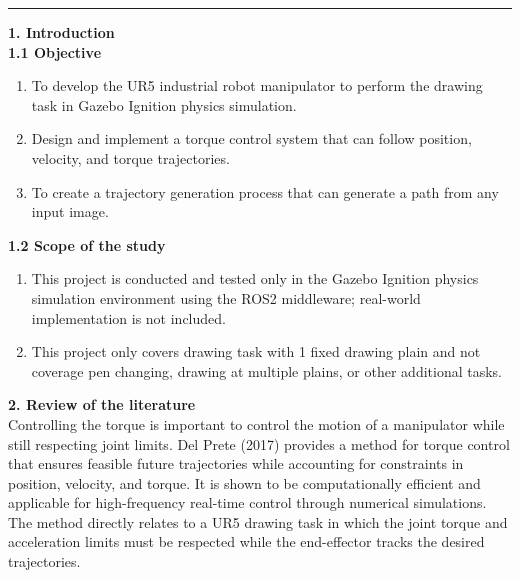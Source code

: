 \documentclass[10pt]{article}
\begin{document}
\vspace{0.4cm}
\noindent
\rule{\textwidth}{1pt}

\linespread{1.5} 
\vspace{0.2cm}
\noindent
\large
\textbf{1. Introduction} \\
\textbf{1.1 Objective}  \\
\normalsize
\begin{enumerate}[nosep, itemsep=-2pt] 
    \item To develop the UR5 industrial robot manipulator to perform the drawing task in Gazebo Ignition physics simulation. 
    \item Design and implement a torque control system that can follow position, velocity, and torque trajectories.
    \item To create a trajectory generation process that can generate a path from any input image.
\end{enumerate}
  
\vspace{8pt}
\noindent
\large 
\textbf{1.2 Scope of the study} \\ 
\normalsize
\begin{enumerate}[nosep, itemsep=-2pt] 
    \item This project is conducted and tested only in the Gazebo Ignition physics simulation environment using the ROS2 middleware; real-world implementation is not included.
    \item This project only covers drawing task with 1 fixed drawing plain and not coverage pen changing, drawing at multiple plains, or other additional tasks.
\end{enumerate}

\newpage

\large
\noindent
\textbf{2. Review of the literature} \\
\normalsize
\indent Controlling the torque is important to control the motion of a manipulator while still respecting joint limits. Del Prete (2017) provides a method for torque control that ensures feasible future trajectories while accounting for constraints in position, velocity, and torque. It is shown to be computationally efficient and applicable for high-frequency real-time control through numerical simulations. The method directly relates to a UR5 drawing task in which the joint torque and acceleration limits must be respected while the end-effector tracks the desired trajectories.
\end{document}
